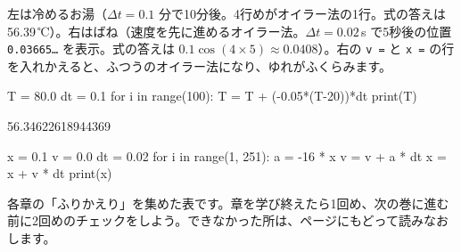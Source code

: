 {\small 左は冷めるお湯（$\Delta t=0.1$ 分で10分後。4行めがオイラー法の1行。式の答えは56.39\,℃）。右はばね（速度を先に進めるオイラー法。$\Delta t=0.02$\,s で5秒後の位置 \texttt{0.03665…} を表示。式の答えは $0.1\cos(4\times5)\approx0.0408$）。右の \texttt{v =} と \texttt{x =} の行を入れかえると、ふつうのオイラー法になり、ゆれがふくらみます。}\par\vspace{1mm}
\noindent\begin{minipage}[t]{0.485\linewidth}\vspace{0pt}
\begin{bkcode}[Python]
T = 80.0
dt = 0.1
for i in range(100):
    T = T + (-0.05*(T-20))*dt
print(T)
\end{bkcode}
\begin{bkcodeout}
56.34622618944369
\end{bkcodeout}
\end{minipage}\hfill
\begin{minipage}[t]{0.485\linewidth}\vspace{0pt}
\begin{bkcode}[Python]
x = 0.1
v = 0.0
dt = 0.02
for i in range(1, 251):
    a = -16 * x
    v = v + a * dt
    x = x + v * dt
print(x)
\end{bkcode}
\end{minipage}\par\vspace{2mm}
{\small 各章の「ふりかえり」を集めた表です。章を学び終えたら1回め、次の巻に進む前に2回めのチェックをしよう。できなかった所は、ページにもどって読みなおします。}\par\vspace{2mm}


